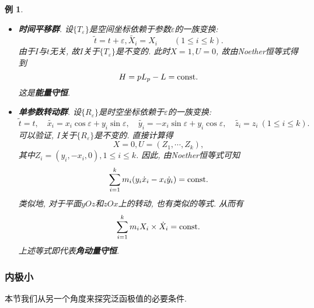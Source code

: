 \documentclass[12pt,a4paper]{article}
\newtheorem{example}[theorem]{例}
\begin{document}
\begin{example}
\begin{itemize}
\begin{equation*}
            \sum_{i = 1}^km_i\dot X_i(t) = \sum_{i = 1}^km_i(\dot x_i(t), \dot y_i(t), \dot z_i(t)) = {\rm const}.
        \end{equation*}
        即\textbf{动量守恒}.
        \item \textbf{时间平移群}. 设$\{T_{\varepsilon}\}$是空间坐标依赖于参数$\varepsilon$的一族变换:
        \begin{equation*}
            \widetilde{t} = t + \varepsilon, \widetilde{X_i} = X_i \qquad (1 \leq i \leq k).
        \end{equation*}
        由于$I$与$t$无关, 故$I$关于$\{T_{\varepsilon}\}$是不变的. 此时$X = 1, U = 0$, 故由Noether恒等式得到
        \begin{equation*}
            H = pL_p - L = {\rm const}. 
        \end{equation*}
        这是\textbf{能量守恒}.
        \item \textbf{单参数转动群}. 设$\{R_{\varepsilon}\}$是时空坐标依赖于$\varepsilon$的一族变换:
        \begin{equation*}
            \widetilde{t} = t, \quad \widetilde{x_i} = x_i\cos\varepsilon + y_i\sin\varepsilon, \quad \widetilde{y_i} = -x_i\sin\varepsilon + y_i\cos\varepsilon, \quad \widetilde{z_i} = z_i \ (1 \leq i \leq k).
        \end{equation*}
        可以验证, $I$关于$\{R_{\varepsilon}\}$是不变的. 直接计算得
        \begin{equation*}
            X = 0, U = (Z_1, \cdots, Z_k), 
        \end{equation*}
        其中$Z_i= (y_i, -x_i, 0), 1 \leq i \leq k$. 因此, 由Noether恒等式可知
        \begin{equation*}
            \sum_{i = 1}^km_i(y_i\dot x_i - x_i\dot y_i) = {\rm const}. 
        \end{equation*}
        类似地, 对于平面$yOz$和$zOx$上的转动, 也有类似的等式. 从而有
        \begin{equation*}
            \sum_{i = 1}^km_i X_i \times \dot X_i = {\rm const}.
        \end{equation*}
        上述等式即代表\textbf{角动量守恒}.
    \end{itemize}
\end{example}

\subsubsection{内极小}

本节我们从另一个角度来探究泛函极值的必要条件.
\end{document}

